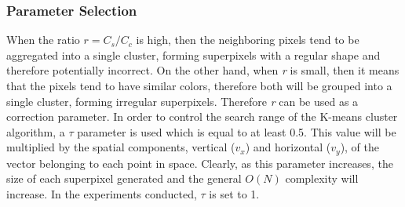 \subsubsection{Parameter Selection}
When the ratio $ r = C_s / C_c $ is high, then the neighboring pixels tend to 
be aggregated into a single cluster, forming superpixels with a regular shape 
and therefore potentially incorrect. On the other hand, when \emph{r} is small, then 
it means that the pixels tend to have similar colors, therefore both will be 
grouped into a single cluster, forming irregular superpixels. Therefore \emph{r} 
can be used as a correction parameter. In order to control the search range 
of the K-means cluster algorithm, a $ \tau $ parameter is used which is equal to at 
least 0.5. This value will be multiplied by the spatial components, vertical 
($ v_x $) and horizontal ($ v_y $), of the vector belonging to each point in space. Clearly, 
as this parameter increases, the size of each superpixel generated and the 
general $ O(N) $ complexity will increase. In the experiments conducted, $ \tau $ 
is set to 1.